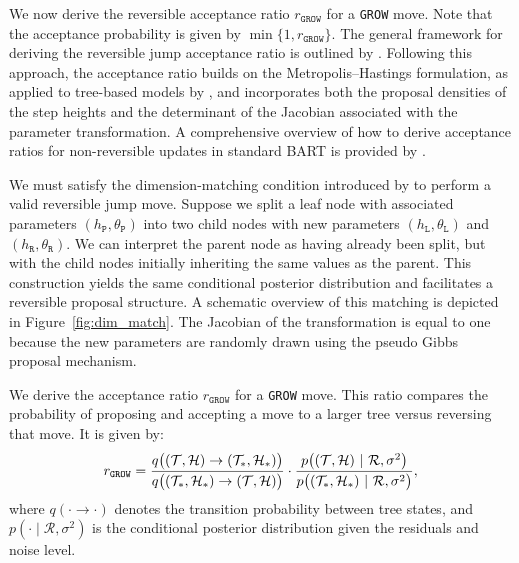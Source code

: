 We now derive the reversible acceptance ratio $r_\texttt{GROW}$ for a \texttt{GROW} move. 
Note that the acceptance probability is given by $\min\{1, r_\texttt{GROW}\}$. 
The general framework for deriving the reversible jump acceptance ratio is outlined by \citet{ReversibleJump}. 
Following this approach, the acceptance ratio builds on the Metropolis--Hastings formulation, as applied to tree-based models by \citet{BARToriginal}, and incorporates both the proposal densities of the step heights and the determinant of the Jacobian associated with the parameter transformation. 
A comprehensive overview of how to derive acceptance ratios for non-reversible updates in standard BART is provided by \citet{Kapelner2016}.

We must satisfy the dimension-matching condition introduced by \citet{ReversibleJump} to perform a valid reversible jump move. 
Suppose we split a leaf node with associated parameters $(h_\texttt{P}, \theta_\texttt{P})$ into two child nodes with new parameters $(h_\texttt{L}, \theta_\texttt{L})$ and $(h_\texttt{R}, \theta_\texttt{R})$. 
We can interpret the parent node as having already been split, but with the child nodes initially inheriting the same values as the parent. 
This construction yields the same conditional posterior distribution and facilitates a reversible proposal structure. 
A schematic overview of this matching is depicted in Figure~\ref{fig:dim_match}. 
The Jacobian of the transformation is equal to one because the new parameters are randomly drawn using the pseudo Gibbs proposal mechanism.





We derive the acceptance ratio $r_\texttt{GROW}$ for a \texttt{GROW} move. 
This ratio compares the probability of proposing and accepting a move to a larger tree versus reversing that move. 
It is given by:
\begin{equation}
    r_\texttt{GROW} = \frac{q\big((\mathcal{T}, \mathcal{H}) \to (\mathcal{T}_*, \mathcal{H}_*)\big)}{q\big((\mathcal{T}_*, \mathcal{H}_*) \to (\mathcal{T}, \mathcal{H})\big)} \cdot \frac{p\big((\mathcal{T}, \mathcal{H}) \ | \ \mathcal{R}, \sigma^2\big)}{p\big((\mathcal{T}_*, \mathcal{H}_*) \ | \ \mathcal{R}, \sigma^2\big)},
\end{equation}
where $q(\cdot \to \cdot)$ denotes the transition probability between tree states, and $p(\cdot \mid \mathcal{R}, \sigma^2)$ is the conditional posterior distribution given the residuals and noise level.

